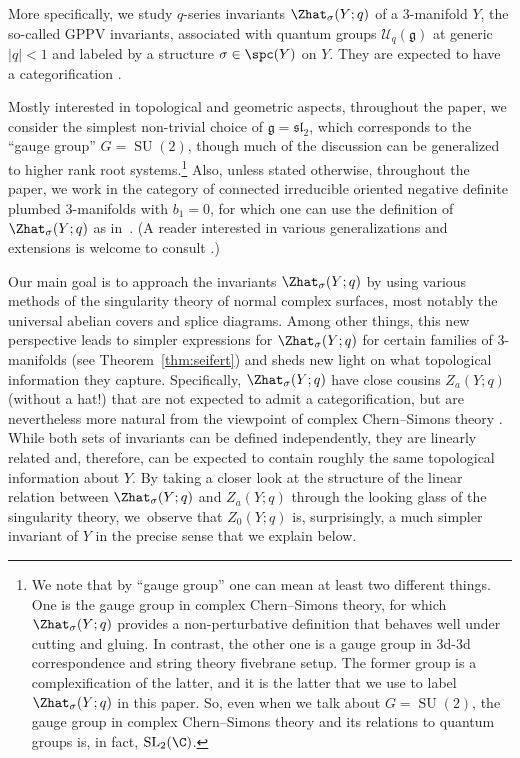 \documentclass[10pt,a4paper]{amsart}
\begin{document}
More specifically, we study $q$-series invariants $\Zhat_{\sigma}(Y; q)$ of a 3-manifold $Y$, the so-called GPPV invariants, associated with quantum groups $\mathcal{U}_q (\mathfrak{g})$ at generic $|q|<1$ and labeled by a \spc{} structure $\sigma \in \spc(Y)$ on $Y$. They are expected to have a categorification \cite{GPV16}.

Mostly interested in topological and geometric aspects, throughout the paper, we consider the simplest non-trivial choice of $\mathfrak{g} = \mathfrak{sl}_2$, which corresponds to the ``gauge group'' $G = \operatorname{SU}(2)$, though much of the discussion can be generalized to higher rank root systems.\footnote{We note that by ``gauge group'' one can mean at least two different things. One is the gauge group in complex Chern--Simons theory, for which $\Zhat_{\sigma}(Y; q)$ provides a non-perturbative definition that behaves well under cutting and gluing. In contrast, the other one is a gauge group in 3d-3d correspondence and string theory fivebrane setup. The former group is a complexification of the latter, and it is the latter that we use to label $\Zhat_{\sigma}(Y; q)$ in this paper. So, even when we talk about $G = \operatorname{SU}(2)$, the gauge group in complex Chern--Simons theory and its relations to quantum groups is, in fact, $\operatorname{SL}_2(\C)$.} Also, unless stated otherwise, throughout the paper, we work in the category of connected irreducible oriented negative definite plumbed 3-manifolds \cite{Neu81} with $b_1 = 0$, for which one can use the definition of~$\Zhat_{\sigma}(Y; q)$ as in~\cite{GPPV20}. (A reader interested in various generalizations and extensions is welcome to consult \cite{AJK21,Chae21, GM21, Pa20a, Pa20b, Pa21, Ri22}.)

Our main goal is to approach the invariants $\Zhat_{\sigma}(Y; q)$ by using various methods of the singularity theory of normal complex surfaces, most notably the universal abelian covers and splice diagrams. Among other things, this new perspective leads to simpler expressions for $\Zhat_{\sigma}(Y; q)$ for certain families of 3-manifolds (see Theorem~\ref{thm:seifert}) and sheds new light on what topological information they capture.
Specifically, $\Zhat_{\sigma}(Y; q)$ have close cousins $Z_a(Y; q)$ (without a hat!) that are not expected to admit a categorification, but are nevertheless more natural from the viewpoint of complex Chern--Simons theory \cite{GMP16}. While both sets of invariants can be defined independently, they are linearly related and, therefore, can be expected to contain roughly the same topological information about $Y$. By taking a closer look at the structure of the linear relation between $\Zhat_{\sigma}(Y; q)$ and $Z_a(Y; q)$ through the looking glass of the singularity theory, we~observe that $Z_0(Y; q)$ is, surprisingly, a much simpler invariant of $Y$ in the precise sense that we explain below.
\end{document}
